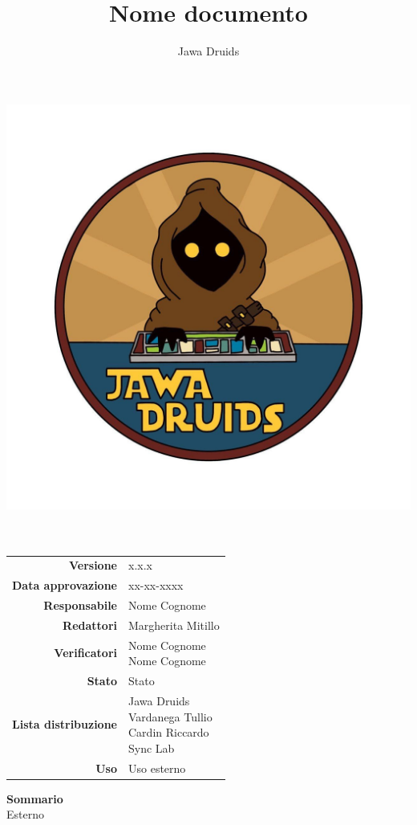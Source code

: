 




\makeatletter
\begin{titlepage}
	\begin{center}
		\vspace*{-5cm}
		\author{Jawa Druids} 
		\title{Nome documento}
		\date{} %
		\includegraphics[width=0.7\linewidth]{../immagini/DRUIDSLOGO.jpg}\\[4ex]
		{\huge \bfseries  \@title }\\[2ex] 
		{\LARGE  \@author}\\[50ex]
		\vspace*{-9cm}
		\begin{table}[H]
			\renewcommand{\arraystretch}{1.4}
			\centering
			\begin{tabular}{r | l}
				\textbf{Versione} & x.x.x \\%
				\textbf{Data approvazione} & xx-xx-xxxx\\
				\textbf{Responsabile} & Nome Cognome\\
				\textbf{Redattori} & Margherita Mitillo \\
				\textbf{Verificatori} & \makecell[tl]{Nome Cognome \\ Nome Cognome} \\
				\textbf{Stato} & Stato\\
				\textbf{Lista distribuzione} & \makecell[tl]{Jawa Druids \\ Vardanega Tullio \\ Cardin Riccardo \\ Sync Lab}\\
				\textbf{Uso} & Uso esterno          
			\end{tabular}
		\end{table}
		\vspace{0.1cm}
		\hfill \break
		\fontsize{17}{10}\textbf{Sommario} \\
		\vspace{0.1cm}
		Esterno
	\end{center}
\end{titlepage}
\makeatother

